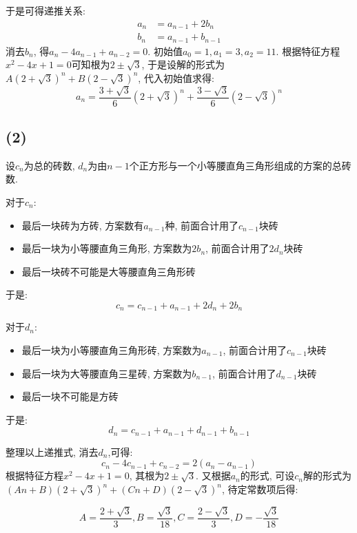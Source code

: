\documentclass[UTF8,oneside]{article}
\begin{document}
于是可得递推关系:
\begin{align*}
    a_n &= a_{n-1} + 2b_n \\
    b_n &= a_{n-1} + b_{n-1}
\end{align*}
消去$b_n$, 得$a_n - 4a_{n-1} + a_{n-2} = 0$. 初始值$a_0 = 1, a_1=3, a_2 = 11$. 根据特征方程$x^2-4x+1=0$可知根为$2\pm\sqrt{3}$, 于是设解的形式为$A(2+\sqrt{3})^n + B(2-\sqrt{3})^n$, 代入初始值求得:
\[
    a_n = \frac{3+\sqrt{3}}{6}(2+\sqrt{3})^n + \frac{3-\sqrt{3}}{6}(2-\sqrt{3})^n
\]

\subsection{(2)}

设$c_n$为总的砖数, $d_n$为由$n-1$个正方形与一个小等腰直角三角形组成的方案的总砖数. 

对于$c_n$:
\begin{itemize}
    \item 最后一块砖为方砖, 方案数有$a_{n-1}$种, 前面合计用了$c_{n-1}$块砖
    \item 最后一块为小等腰直角三角形, 方案数为$2b_n$, 前面合计用了$2d_n$块砖
    \item 最后一块砖不可能是大等腰直角三角形砖
\end{itemize}
于是:
\[
    c_n = c_{n-1} + a_{n-1} + 2d_n + 2b_n
\]

对于$d_n$:
\begin{itemize}
    \item 最后一块为小等腰直角三角形砖, 方案数为$a_{n-1}$, 前面合计用了$c_{n-1}$块砖
    \item 最后一块为大等腰直角三星砖, 方案数为$b_{n-1}$, 前面合计用了$d_{n-1}$块砖
    \item 最后一块不可能是方砖
\end{itemize}
于是:
\[
    d_n = c_{n-1} + a_{n-1} + d_{n-1} + b_{n-1}
\]

整理以上递推式, 消去$d_n$,可得:
\[
    c_n - 4c_{n-1} + c_{n-2} = 2(a_n - a_{n-1})
\]
根据特征方程$x^2-4x+1=0$, 其根为$2\pm \sqrt{3}$. 又根据$a_n$的形式, 可设$c_n$解的形式为$(An + B)(2+\sqrt{3})^n + (Cn + D)(2-\sqrt{3})^n$, 待定常数项后得:

\[
    A = \frac{2+\sqrt{3}}{3}, B = \frac{\sqrt{3}}{18}, C = \frac{2-\sqrt{3}}{3}, D = -\frac{\sqrt{3}}{18}
\]
\end{document}
